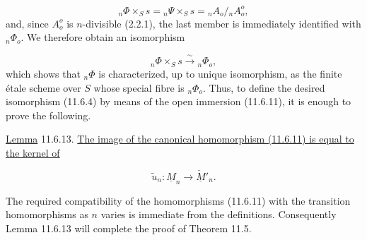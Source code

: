 \begin{equation*}
{}_n\Phi\times_Ss={}_n\Psi\times_Ss={}_nA_o/{}_nA_o^o,
\end{equation*}
and, since $A_o^o$ is $n$-divisible (2.2.1), the last member is
immediately identified with ${}_n\Phi_o$. We therefore obtain an
isomorphism

\begin{equation}\tag{11.6.12}
{}_n\Phi\times_Ss\xrightarrow{\ \sim\ }{}_n\Phi_o,
\end{equation}
which shows that ${}_n\Phi$ is characterized, up to unique isomorphism,
as the finite \'etale scheme over $S$ whose special fibre is
${}_n\Phi_o$. Thus, to define the desired isomorphism (11.6.4) by means
of the open immersion (11.6.11), it is enough to prove the following.

\medskip
\noindent
\underline{Lemma} 11.6.13. \underline{The image of the canonical
homomorphism (11.6.11) is equal to the kernel of}

\begin{equation*}
\widetilde u_n:\underline M_n\longrightarrow\underline{\check M}'_n.
\end{equation*}

The required compatibility of the homomorphisms (11.6.11) with the
transition homomorphisms as $n$ varies is immediate from the
definitions. Consequently Lemma 11.6.13 will complete the proof of
Theorem 11.5.

